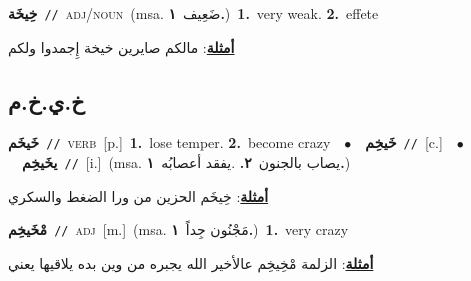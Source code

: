 \documentclass[10pt,a4paper,twoside]{article} %
\begin{document}
\begin{multicols}{2}
{\setlength\topsep{0pt}\textbf{\foreignlanguage{arabic}{خِيخَة}}\ {\color{gray}\texttt{//}\color{black}}\ \textsc{adj/noun}\ \color{gray}(msa. \foreignlanguage{arabic}{ضَعِيف}~\foreignlanguage{arabic}{\textbf{١.}})\color{black}\ \textbf{1.}~very weak.  \textbf{2.}~effete\  \begin{flushright}\color{gray}\foreignlanguage{arabic}{\textbf{\underline{\foreignlanguage{arabic}{أمثلة}}}: مالكم صايرين خيخة إِجمدوا ولكم}\end{flushright}\color{black}} \vspace{2mm}

\vspace{-3mm}
\subsection*{\color{blue}\foreignlanguage{arabic}{خ.ي.خ.م}\color{blue}{}} 

{\setlength\topsep{0pt}\textbf{\foreignlanguage{arabic}{خَيخَم}}\ {\color{gray}\texttt{//}\color{black}}\ \textsc{verb}\ [p.]\ \textbf{1.}~lose temper.  \textbf{2.}~become crazy\ \ $\bullet$\ \ \setlength\topsep{0pt}\textbf{\foreignlanguage{arabic}{خَيخِم}}\ {\color{gray}\texttt{//}\color{black}}\ [c.]\ \ $\bullet$\ \ \setlength\topsep{0pt}\textbf{\foreignlanguage{arabic}{يخَيخِم}}\ {\color{gray}\texttt{//}\color{black}}\ [i.]\ \color{gray}(msa. \foreignlanguage{arabic}{يصاب بالجنون}~\foreignlanguage{arabic}{\textbf{٢.}}  .\foreignlanguage{arabic}{يفقد أعصابُه}~\foreignlanguage{arabic}{\textbf{١.}})\color{black}\  \begin{flushright}\color{gray}\foreignlanguage{arabic}{\textbf{\underline{\foreignlanguage{arabic}{أمثلة}}}: خِيخَم الحزين من ورا الضغط والسكري}\end{flushright}\color{black}} \vspace{2mm}

{\setlength\topsep{0pt}\textbf{\foreignlanguage{arabic}{مْخَيخِم}}\ {\color{gray}\texttt{//}\color{black}}\ \textsc{adj}\ [m.]\ \color{gray}(msa. \foreignlanguage{arabic}{مَجْنُون جِداً}~\foreignlanguage{arabic}{\textbf{١.}})\color{black}\ \textbf{1.}~very crazy\  \begin{flushright}\color{gray}\foreignlanguage{arabic}{\textbf{\underline{\foreignlanguage{arabic}{أمثلة}}}: الزلمة مْخِيخِم عالأخير الله يجبره من وين بده يلاقيها يعني}\end{flushright}\color{black}} \vspace{2mm}


\end{multicols}
\end{document}
